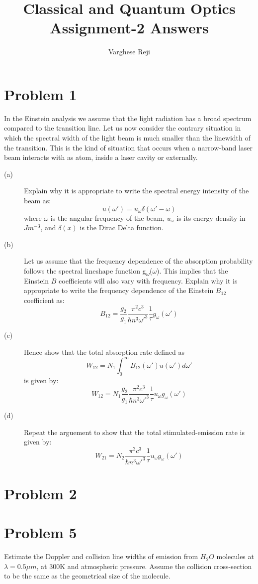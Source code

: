 \documentclass[a4paper,11pt]{article}
\author{Varghese Reji}
\date{}
\title{Classical and Quantum Optics\\\medskip
\large Assignment-2 Answers}
\begin{document}
\maketitle

\section*{Problem 1}
\label{sec:org27c5640}
In the Einstein analysis we assume that the light radiation has a broad spectrum compared to the transition line. Let us now consider the contrary situation in which the spectral width of the light beam is much smaller than the linewidth of the transition. This is the kind of situation that occurs when a narrow-band laser beam interacts with as atom, inside a laser cavity or externally.
\begin{description}
\item[{(a)}] Explain why it is appropriate to write the spectral energy intensity of the beam as:
$$u(\omega') = u_\omega\delta(\omega'-\omega)$$
where \(\omega\) is the angular frequency of the beam, \(u_\omega\) is its energy density in \(Jm^{-3}\), and \(\delta(x)\) is the Dirac Delta function.
\item[{(b)}] Let us assume that the frequency dependence of the absorption probability follows the spectral lineshape function g\textsubscript{\(\omega\)}(\(\omega\)). This implies that the Einstein \(B\) coefficients will also vary with frequency. Explain why it is appropriate to write the frequency dependence of the Einstein \(B_{12}\) coefficient as:
$$B_{12} = \frac{g_2}{g_1} \frac{\pi^2c^3}{\hbar n^3\omega'^3} \frac{1}{\tau} g_{\omega}(\omega')$$
\item[{(c)}] Hence show that the total absorption rate defined as
$$W_{12} = N_1\int_{0}^{\infty} B_{12}(\omega') u(\omega')d\omega'$$
is given by:
$$W_{12} = N_1 \frac{g_2}{g_1} \frac{\pi^2c^3}{\hbar n^3\omega'^3} \frac{1}{\tau} u_{\omega}g_{\omega}(\omega')$$
\item[{(d)}] Repeat the arguement to show that the total stimulated-emission rate is given by:
$$W_{21} = N_2 \frac{\pi^2c^3}{\hbar n^3\omega'^3} \frac{1}{\tau} u_{\omega}g_{\omega}(\omega')$$
\end{description}

\section*{Problem 2}
\label{sec:orgbfdb591}

\newpage
\section*{Problem 5}
\label{sec:org14a5f9a}
Estimate the Doppler and collision line widths of emission from \(H_2O\) molecules at \(\lambda = 0.5\mu m\), at 300K and atmospheric pressure. Assume the collision cross-section to be the same as the geometrical size of the molecule.
\end{document}
